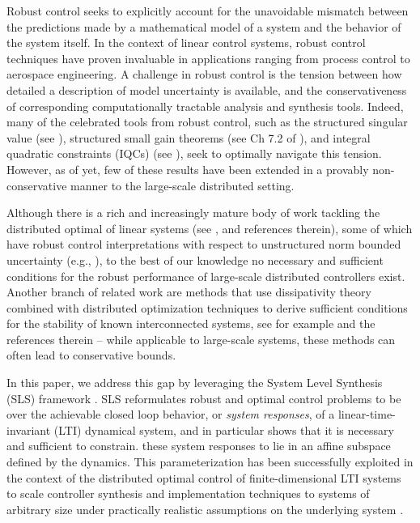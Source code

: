 Robust control seeks to explicitly account for the unavoidable mismatch between the predictions made by a mathematical model of a system and the behavior of the system itself.  In the context of linear control systems, robust control techniques \cite{khammash1990stability,dahleh1994control,zhou1996robust} have proven invaluable in applications ranging from process control to aerospace engineering.  A challenge in robust control is the tension between how detailed a description of model uncertainty is available, and the conservativeness of corresponding computationally tractable analysis and synthesis tools.  Indeed, many of the celebrated tools from robust control, such as the structured singular value (see \cite{packard1993complex}), structured small gain theorems (see Ch 7.2 of \cite{dahleh1994control}), and integral quadratic constraints (IQCs) (see \cite{megretski1997system}), seek to optimally navigate this tension.  However, as of yet, few of these results have been extended in a provably non-conservative manner to the large-scale distributed setting.

Although there is a rich and increasingly mature body of work tackling the distributed optimal of linear systems (see \cite{2006_Rotkowitz_QI_TAC, 2012_Mahajan_Info_survey, wang2019system,zheng2019equivalence}, and references therein), some of which have robust control interpretations with respect to unstructured norm bounded uncertainty (e.g., \cite{langbort2004distributed,matni2014distributed,lessard2014state,rosinger2017structured,ahmadi2018distributed}), to the best of our knowledge no necessary and sufficient conditions for the robust performance of large-scale distributed controllers exist.  Another branch of related work are methods that use dissipativity theory combined with distributed optimization techniques to derive sufficient conditions for the stability of known interconnected systems, see for example \cite{arcak2016networks,meissen2015compositional,anderson2011dynamical} and the references therein -- while applicable to large-scale systems, these methods can often lead to conservative bounds.


In this paper, we address this gap by leveraging the System Level Synthesis (SLS)  framework \cite{anderson2019system,wang2019system}.  SLS reformulates robust and optimal control problems to be over the achievable closed loop behavior, or \emph{system responses}, of a linear-time-invariant (LTI) dynamical system, and in particular shows that it is necessary and sufficient to constrain. these system responses to lie in an affine subspace defined by the dynamics.  This parameterization has been successfully exploited in the context of the distributed optimal control of finite-dimensional LTI systems to scale controller synthesis and implementation techniques to systems of arbitrary size under practically realistic assumptions on the underlying system \cite{wang2014localized, wang2015localized,wang2018separable}.

